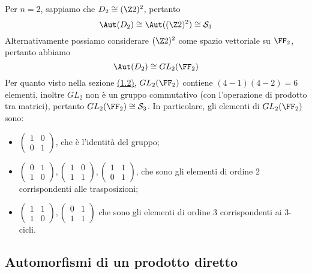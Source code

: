 \documentclass[11pt]{scrartcl}
\begin{document}
Per $n = 2$, sappiamo che $D_2 \cong (\Z2)^2$, pertanto 
\[
    \Aut(D_2) \cong \Aut((\Z2)^2) \cong \mathcal{S}_3
\]
Alternativamente possiamo considerare $(\Z2)^2$ come spazio vettoriale su $\FF_2$,
pertanto abbiamo 
\[
    \Aut(D_2) \cong GL_2(\FF_2)
\]Per quanto visto nella sezione \hyperref[sez 1.2]{(1.2)}, $GL_2(\FF_2)$ 
contiene $(4 - 1)(4 - 2) = 6$ elementi, inoltre $GL_2$ non è un gruppo 
commutativo (con l'operazione di prodotto tra matrici), pertanto $GL_2(\FF_2) \cong \mathcal{S}_3$.
In particolare, gli elementi di $GL_2(\FF_2)$ sono:
\begin{itemize}
    \item $\begin{pmatrix}
    1 & 0\\
    0 & 1
    \end{pmatrix}$, che è l'identità del gruppo;
    \item $\begin{pmatrix}
    0 & 1\\
    1 & 0
    \end{pmatrix}, \begin{pmatrix}
        1 & 0\\
        1 & 1
    \end{pmatrix}, \begin{pmatrix}
        1 & 1\\
        0 & 1
    \end{pmatrix}$, che sono gli elementi di ordine 2 corrispondenti alle 
    trasposizioni;
    \item $\begin{pmatrix}
    1 & 1\\
    1 & 0
    \end{pmatrix}, \begin{pmatrix}
        0 & 1\\
        1 & 1
    \end{pmatrix}$ che sono gli elementi di ordine $3$ corrispondenti ai $3$-cicli.
\end{itemize}

\newpage

\subsection{Automorfismi di un prodotto diretto}
\end{document}
